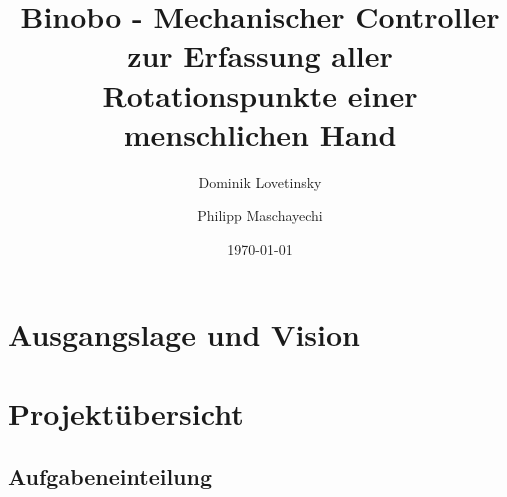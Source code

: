 \documentclass[paper=a4,12pt]{scrreprt}
\title{Binobo - Mechanischer Controller zur Erfassung aller Rotationspunkte einer menschlichen Hand}
\author{Dominik Lovetinsky \and Philipp Maschayechi}
\date{\today}
\begin{document}
\frontmatter

\maketitle

\begin{Eid}%
\end{Eid}\newpage








\tableofcontents


\mainmatter

\chapter{Ausgangslage und Vision}
\label{chap:Objective}



\chapter{Projektübersicht}




\section{Aufgabeneinteilung}

\end{document}
